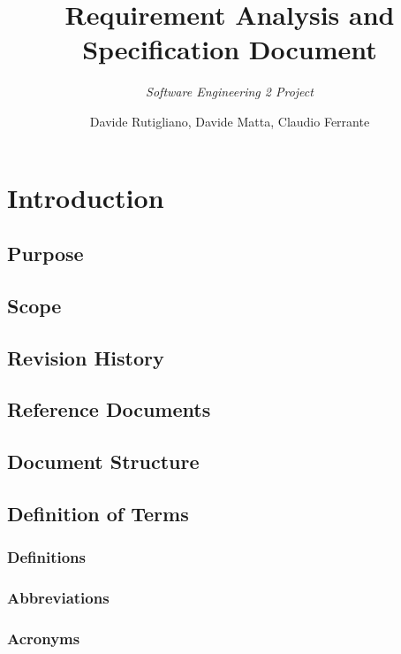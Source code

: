 \documentclass{paper}
\title{\textbf{Requirement Analysis and\\ Specification Document}}
\subtitle{\textit{Software Engineering 2 Project}}
\author{Davide Rutigliano, Davide Matta, Claudio Ferrante}
\begin{document}
\maketitle
\tableofcontents
\newpage
\section{Introduction}

    \subsection{Purpose}
    
    \subsection{Scope}
    
    \subsection{Revision History}
    
    \subsection{Reference Documents}
    
    \subsection{Document Structure}
    
        \subsection{Definition of Terms}
    
        \subsubsection{Definitions}

        \subsubsection{Abbreviations}
        
        \subsubsection{Acronyms}
            \begin{acronym}
            \end{acronym}
    
\end{document}
